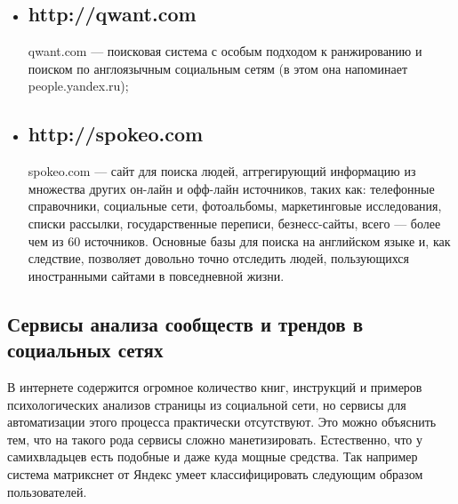 \begin{chap1}
\begin{itemize}
topsy.com - realtime поисковая система, специализирующаяся на поиске по социальным медиа, таким как блоги, твиттер, сообщения в социальных сетях;
\item \subsection{http://qwant.com}
qwant.com — поисковая система с особым подходом к ранжированию и поиском по англоязычным социальным сетям (в этом она напоминает people.yandex.ru);
\item \subsection{http://spokeo.com}
spokeo.com — сайт для поиска людей, аггрегирующий информацию из множества других он-лайн и офф-лайн источников, таких как: телефонные справочники, социальные сети, фотоальбомы, маркетинговые исследования, списки рассылки, государственные переписи, безнесс-сайты, всего — более чем из 60 источников. Основные базы для поиска на английском языке и, как следствие, позволяет довольно точно отследить людей, пользующихся иностранными сайтами в повседневной жизни.
\end{itemize}

\subsection{Сервисы анализа сообществ и трендов в социальных сетях}
В интернете содержится огромное количество книг, инструкций и примеров психологических анализов страницы из социальной сети, но сервисы для автоматизации этого процесса практически отсутствуют. Это можно объяснить тем, что на такого рода сервисы сложно манетизировать. Естественно, что у самихвладьцев есть подобные и даже куда мощные средства. Так например система матрикснет от Яндекс умеет классифицировать следующим образом пользователей.\\ %


\end{chap1}
